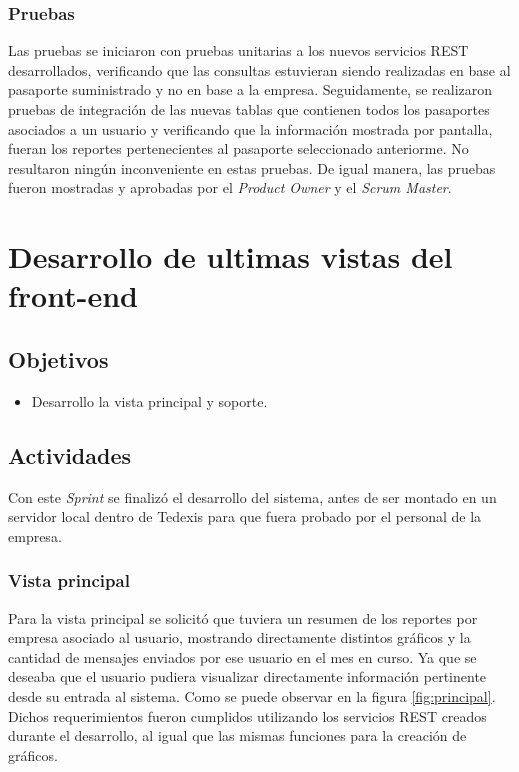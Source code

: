 \subsubsection{Pruebas}
\indent Las pruebas se iniciaron con pruebas unitarias a los nuevos servicios REST desarrollados, verificando que las consultas estuvieran siendo realizadas en base al pasaporte suministrado y no en base a la empresa. Seguidamente, se realizaron pruebas de integración de las nuevas tablas que contienen todos los pasaportes asociados a un usuario y verificando que la información mostrada por pantalla, fueran los reportes pertenecientes al pasaporte seleccionado anteriorme. No resultaron ningún inconveniente en estas pruebas. De igual manera, las pruebas fueron mostradas y aprobadas por el \textit{Product Owner} y el \textit{Scrum Master}.


\section{Desarrollo de ultimas vistas del front-end} \label{sect:Desarrollo de ultimas vistas del front-end}

\subsection{Objetivos}
\begin{itemize}[noitemsep,nolistsep]
\item Desarrollo la vista principal y soporte. 
\end{itemize}

\subsection{Actividades}
\indent Con este \textit{Sprint} se finalizó el desarrollo del sistema, antes de ser montado en un servidor local dentro de Tedexis para que fuera probado por el personal de la empresa.

\subsubsection{Vista principal}
\indent Para la vista principal se solicitó que tuviera un resumen de los reportes por empresa asociado al usuario, mostrando directamente distintos gráficos y la cantidad de mensajes enviados por ese usuario en el mes en curso. Ya que se deseaba que el usuario pudiera visualizar directamente información pertinente desde su entrada al sistema. Como se puede observar en la figura \ref{fig:principal}. Dichos requerimientos fueron cumplidos utilizando los servicios REST creados durante el desarrollo, al igual que las mismas funciones para la creación de gráficos. 

